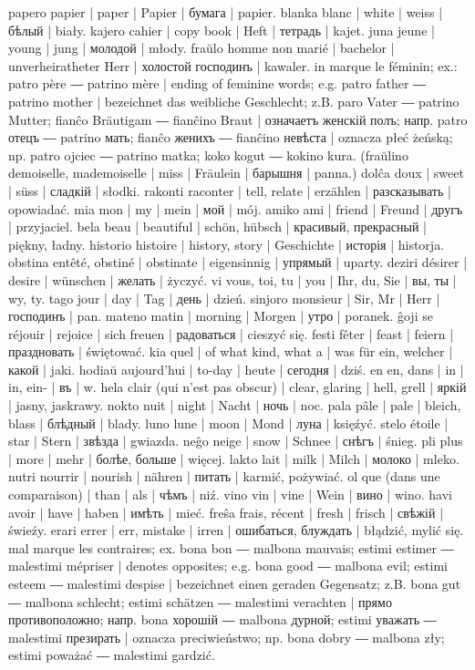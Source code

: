 papero papier | paper | Papier | бумага | papier.
blanka blanc | white | weiss | бѣлый | biały.
kajero cahier | copy book | Heft | тетрадь | kajet.
juna jeune | young | jung | молодой | młody.
fraŭlo homme non marié | bachelor | unverheiratheter Herr | холостой господинъ | kawaler.
in marque le féminin; ex.: patro père ― patrino mère | ending of feminine words; e.g. patro father ― patrino mother | bezeichnet das weibliche Geschlecht; z.B. paro Vater ― patrino Mutter; fianĉo Bräutigam ― fianĉino Braut | означаетъ женскій полъ; напр. patro отецъ ― patrino мать; fianĉo женихъ ― fianĉino невѣста | oznacza płeć żeńską; np. patro ojciec ― patrino matka; koko kogut ― kokino kura.
(fraŭlino demoiselle, mademoiselle | miss | Fräulein | барышня | panna.)
dolĉa doux | sweet | süss | сладкій | słodki.
rakonti raconter | tell, relate | erzählen | разсказывать | opowiadać.
mia mon | my | mein | мой | mój.
amiko ami | friend | Freund | другъ | przyjaciel.
bela beau | beautiful | schön, hübsch | красивый, прекрасный | piękny, ładny.
historio histoire | history, story | Geschichte | исторія | historja.
obstina entêté, obstiné | obstinate | eigensinnig | упрямый | uparty.
deziri désirer | desire | wünschen | желать | życzyć.
vi vous, toi, tu | you | Ihr, du, Sie | вы, ты | wy, ty.
tago jour | day | Tag | день | dzień.
sinjoro monsieur | Sir, Mr | Herr | господинъ | pan.
mateno matin | morning | Morgen | утро | poranek.
ĝoji se réjouir | rejoice | sich freuen | радоваться | cieszyć się.
festi fêter | feast | feiern | праздновать | świętować.
kia quel | of what kind, what a | was für ein, welcher | какой | jaki.
hodiaŭ aujourd’hui | to-day | heute | сегодня | dziś.
en en, dans | in | in, ein- | въ | w.
hela clair (qui n’est pas obscur) | clear, glaring | hell, grell | яркій | jasny, jaskrawy.
nokto nuit | night | Nacht | ночь | noc.
pala pâle | pale | bleich, blass | блѣдный | blady.
luno lune | moon | Mond | луна | księźyć.
stelo étoile | star | Stern | звѣзда | gwiazda.
neĝo neige | snow | Schnee | снѣгъ | śnieg.
pli plus | more | mehr | болѣе, больше | więcej.
lakto lait | milk | Milch | молоко | mleko.
nutri nourrir | nourish | nähren | питать | karmić, pożywiać.
ol que (dans une comparaison) | than | als | чѣмъ | niź.
vino vin | vine | Wein | вино | wino.
havi avoir | have | haben | имѣть | mieć.
freŝa frais, récent | fresh | frisch | свѣжій | świeźy.
erari errer | err, mistake | irren | ошибаться, блуждать | błądzić, mylić się.
mal marque les contraires; ex. bona bon ― malbona mauvais; estimi estimer ― malestimi mépriser | denotes opposites; e.g. bona good ― malbona evil; estimi esteem ― malestimi despise | bezeichnet einen geraden Gegensatz; z.B. bona gut ― malbona schlecht; estimi schätzen ― malestimi verachten | прямо противоположно; напр. bona хорошій ― malbona дурной; estimi уважать ― malestimi презирать | oznacza preciwieństwo; np. bona dobry ― malbona zły; estimi poważać ― malestimi gardzić.
